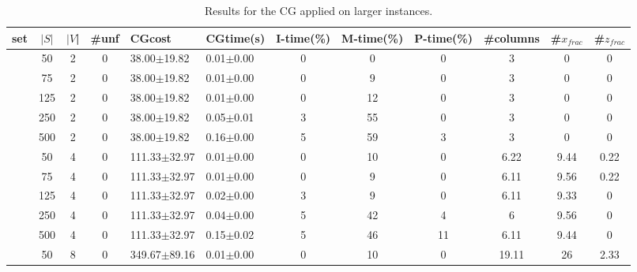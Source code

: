 \documentclass[article]{llncs}
\begin{document}
\begin{table}[h]
\begin{center}
  \caption{Results for the CG applied on larger instances. \label{tab:full}}
  \begin{tabular}{c c c c l l c c c c c c}
set & $|S|$ & $|V$| & \#unf  & CGcost  &  CGtime(s)  &  I-time(\%)  &  M-time(\%) & P-time(\%)  &  \#columns  &  \#$x_{frac}$  &  \#$z_{frac}$ \\

\hline
 &50      &  2   &    0  &  38.00$\pm$19.82     &        0.01$\pm$0.00  &  0  &          0   &            0   &         3       &       0       &  0       \\
 &75      &  2   &    0  &  38.00$\pm$19.82     &        0.01$\pm$0.00  &  0  &          9   &            0   &         3       &       0       &  0       \\
 &125     &  2   &    0  &  38.00$\pm$19.82     &        0.01$\pm$0.00  &  0  &          12  &            0   &         3       &       0       &  0       \\
 &250     &  2   &    0  &  38.00$\pm$19.82     &        0.05$\pm$0.01  &  3  &          55  &            0   &         3       &       0       &  0       \\
 &500     &  2   &    0  &  38.00$\pm$19.82     &        0.16$\pm$0.00  &  5  &          59  &            3   &         3       &       0       &  0       \\
 &50      &  4   &    0  &  111.33$\pm$32.97    &        0.01$\pm$0.00  &  0  &          10  &            0   &         6.22    &       9.44    &  0.22    \\
 &75      &  4   &    0  &  111.33$\pm$32.97    &        0.01$\pm$0.00  &  0  &          9   &            0   &         6.11    &       9.56    &  0.22    \\
 &125     &  4   &    0  &  111.33$\pm$32.97    &        0.02$\pm$0.00  &  3  &          9   &            0   &         6.11    &       9.33    &  0       \\
 &250     &  4   &    0  &  111.33$\pm$32.97    &        0.04$\pm$0.00  &  5  &          42  &            4   &         6       &       9.56    &  0       \\
 &500     &  4   &    0  &  111.33$\pm$32.97    &        0.15$\pm$0.02  &  5  &          46  &            11  &         6.11    &       9.44    &  0       \\
 &50      &  8   &    0  &  349.67$\pm$89.16    &        0.01$\pm$0.00  &  0  &          10  &            0   &         19.11   &       26      &  2.33    \\

\end{tabular}
\end{center}
\end{table}
\end{document}
